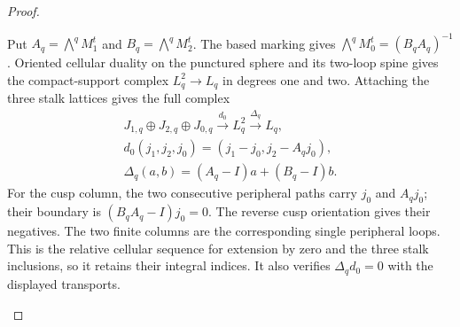 \begin{proof}
\begin{enumerate}[label=\arabic*.,leftmargin=*]
Put $A_q=\bigwedge^qM_1^t$ and $B_q=\bigwedge^qM_2^t$.
The based marking gives
$\bigwedge^qM_0^t=(B_qA_q)^{-1}$.
Oriented cellular duality on the punctured sphere and its two-loop
spine gives the compact-support complex $L_q^2\to L_q$ in degrees
one and two.  Attaching the three stalk lattices gives the full complex
\[
\begin{gathered}
 J_{1,q}\oplus J_{2,q}\oplus J_{0,q}
 \xrightarrow{d_0}L_q^2\xrightarrow{\Delta_q}L_q,\\
 d_0(j_1,j_2,j_0)=(j_1-j_0,j_2-A_qj_0),\\
 \Delta_q(a,b)=(A_q-I)a+(B_q-I)b.
\end{gathered}
\]
For the cusp column, the two consecutive peripheral paths carry
$j_0$ and $A_qj_0$; their boundary is
$(B_qA_q-I)j_0=0$.  The reverse cusp orientation gives their negatives.
The two finite columns are the corresponding single peripheral
loops.  This is the relative cellular sequence for extension by zero
and the three stalk inclusions, so it retains their integral indices.
It also verifies $\Delta_qd_0=0$ with the displayed transports.


\end{enumerate}
\end{proof}
